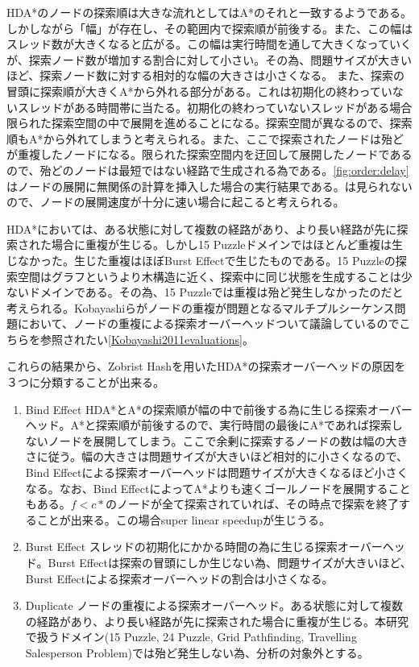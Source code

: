 \documentclass{jsarticle}
\begin{document}
HDA*のノードの探索順は大きな流れとしてはA*のそれと一致するようである。しかしながら「幅」が存在し、その範囲内で探索順が前後する。また、この幅はスレッド数が大きくなると広がる。この幅は実行時間を通して大きくなっていくが、探索ノード数が増加する割合に対して小さい。その為、問題サイズが大きいほど、探索ノード数に対する相対的な幅の大きさは小さくなる。
また、探索の冒頭に探索順が大きくA*から外れる部分がある。これは初期化の終わっていないスレッドがある時間帯に当たる。初期化の終わっていないスレッドがある場合限られた探索空間の中で展開を進めることになる。探索空間が異なるので、探索順もA*から外れてしまうと考えられる。また、ここで探索されたノードは殆どが重複したノードになる。限られた探索空間内を迂回して展開したノードであるので、殆どのノードは最短ではない経路で生成される為である。\ref{fig:order:delay}はノードの展開に無関係の計算を挿入した場合の実行結果である。は見られないので、ノードの展開速度が十分に速い場合に起こると考えられる。

HDA*においては、ある状態に対して複数の経路があり、より長い経路が先に探索された場合に重複が生じる。しかし15 Puzzleドメインではほとんど重複は生じなかった。生じた重複はほぼBurst Effectで生じたものである。15 Puzzleの探索空間はグラフというより木構造に近く、探索中に同じ状態を生成することは少ないドメインである。その為、15 Puzzleでは重複は殆ど発生しなかったのだと考えられる。Kobayashiらがノードの重複が問題となるマルチプルシーケンス問題において、ノードの重複による探索オーバーヘッドついて議論しているのでこちらを参照されたい\ref{Kobayashi2011evaluations}。

これらの結果から、Zobrist Hashを用いたHDA*の探索オーバーヘッドの原因を３つに分類することが出来る。

\begin{enumerate}
\item Bind Effect
\newline
HDA*とA*の探索順が幅の中で前後する為に生じる探索オーバーヘッド。A*と探索順が前後するので、実行時間の最後にA*であれば探索しないノードを展開してしまう。ここで余剰に探索するノードの数は幅の大きさに従う。幅の大きさは問題サイズが大きいほど相対的に小さくなるので、Bind Effectによる探索オーバーヘッドは問題サイズが大きくなるほど小さくなる。なお、Bind EffectによってA*よりも速くゴールノードを展開することもある。$f < c*$のノードが全て探索されていれば、その時点で探索を終了することが出来る。この場合super linear speedupが生じうる。
\newline

\item Burst Effect
\newline
スレッドの初期化にかかる時間の為に生じる探索オーバーヘッド。Burst Effectは探索の冒頭にしか生じない為、問題サイズが大きいほど、Burst Effectによる探索オーバーヘッドの割合は小さくなる。
\newline

\item Duplicate
\newline
ノードの重複による探索オーバーヘッド。ある状態に対して複数の経路があり、より長い経路が先に探索された場合に重複が生じる。本研究で扱うドメイン(15 Puzzle, 24 Puzzle, Grid Pathfinding, Travelling Salesperson Problem)では殆ど発生しない為、分析の対象外とする。

\end{enumerate}
\end{document}
